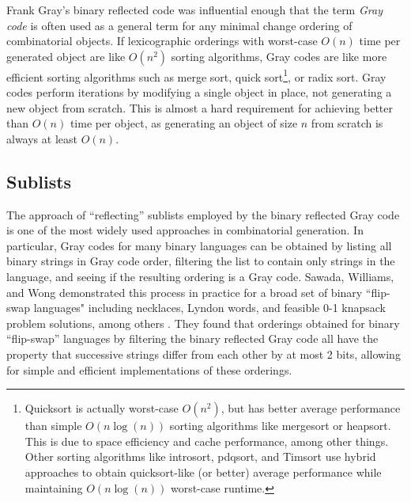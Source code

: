 Frank Gray's binary reflected code was influential enough that the term \emph{Gray code} is often used as a general term for any minimal change ordering of combinatorial objects.  If lexicographic orderings with worst-case $O(n)$ time per generated object are like $O(n^2)$ sorting algorithms, Gray codes are like more efficient sorting algorithms such as merge sort, quick sort\footnote{Quicksort is actually worst-case $O(n^2)$, but has better average performance than simple $O(n \log(n))$ sorting algorithms like mergesort or heapsort.  This is due to space efficiency and cache performance, among other things.  Other sorting algorithms like introsort, pdqsort, and Timsort use hybrid approaches to obtain quicksort-like (or better) average performance while maintaining $O(n \log(n))$ worst-case runtime.}, or radix sort.  Gray codes perform iterations by modifying a single object in place, not generating a new object from scratch.  This is almost a hard requirement for achieving better than $O(n)$ time per object, as generating an object of size $n$ from scratch is always at least $O(n)$.


\subsection{Sublists}
The approach of ``reflecting'' sublists employed by the binary reflected Gray code is one of the most widely used approaches in combinatorial generation. In particular, Gray codes for many binary languages can be obtained by listing all binary strings in Gray code order, filtering the list to contain only strings in the language, and seeing if the resulting ordering is a Gray code.  Sawada, Williams, and Wong demonstrated this process in practice for a broad set of binary ``flip-swap languages" including necklaces, Lyndon words, and feasible 0-1 knapsack problem solutions, among others \cite{sawada2021inside}.  They found that orderings obtained for binary ``flip-swap'' languages by filtering the binary reflected Gray code all have the property that successive strings differ from each other by at most 2 bits, allowing for simple and efficient implementations of these orderings.


